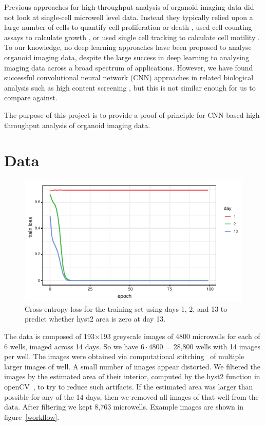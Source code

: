 \documentclass[10pt,twocolumn,letterpaper]{article}
\begin{document}
Previous approaches for high-throughput analysis of organoid imaging data did not look at single-cell microwell level data.  Instead they typically relied upon a large number of cells to quantify cell proliferation or death \cite{jabs2017screening},  used cell counting assays to calculate growth \cite{sebrell2018live}, or used single cell tracking to calculate cell motility \cite{geum2016epidermal}.  To our knowledge, no deep learning approaches have been proposed to analyse organoid imaging data, despite the large success in deep learning to analysing imaging data across a broad spectrum of applications.  However, we have found successful convolutional neural network (CNN) approaches in related biological analysis such as high content screening \cite{simm2018repurposing}, but this is not similar enough for us to compare against.

The purpose of this project is to provide a proof of principle for CNN-based high-throughput analysis of organoid imaging data.  



\section{Data}




 \begin{figure}[b!]
\begin{center}
 \includegraphics[width=0.9\linewidth]{figures/day13_train_loss_vs_epoch_vs_day_v2.pdf}
\end{center}
   \caption{Cross-entropy loss for the training set using days 1, 2, and 13 to predict whether hyst2 area is zero at day 13.}
\label{train_loss_day_1_2_13}
\end{figure}

The data is composed of 193$\times$193 greyscale images of 4800 microwells for each of 6 wells, imaged across 14 days.  So we have $6 \cdot 4800$ = 28,800 wells with 14 images per well.  The images were obtained via computational stitching~\cite{preibisch2009globally} of multiple larger images of well.  A small number of images appear distorted.  We filtered the images by the estimated area of their interior, computed by the hyst2 function in openCV~\cite{opencv_library}, to try to reduce such artifacts.  If the estimated area was larger than possible for any of the 14 days, then we removed all images of that well from the data.  After filtering we kept 8,763 microwells.  Example images are shown in figure~\ref{workflow}.
\end{document}
